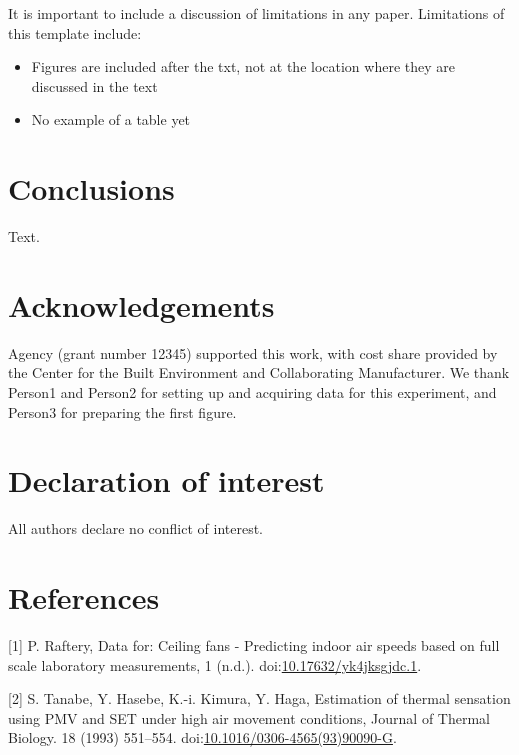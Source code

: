 \documentclass[]{elsarticle} %
\providecommand{\tightlist}{%
  \setlength{\itemsep}{0pt}\setlength{\parskip}{0pt}}
\begin{document}
It is important to include a discussion of limitations in any paper.
Limitations of this template include:

\begin{itemize}
\tightlist
\item
  Figures are included after the txt, not at the location where they are
  discussed in the text
\item
  No example of a table yet
\end{itemize}

\section{Conclusions}\label{conclusions}

Text.

\section{Acknowledgements}\label{acknowledgements}

Agency (grant number 12345) supported this work, with cost share
provided by the Center for the Built Environment and Collaborating
Manufacturer. We thank Person1 and Person2 for setting up and acquiring
data for this experiment, and Person3 for preparing the first figure.

\section{Declaration of interest}\label{declaration-of-interest}

All authors declare no conflict of interest.

\section*{References}\label{references}

\hypertarget{refs}{}
\hypertarget{ref-rafteryDataCeilingFans}{}
{[}1{]} P. Raftery, Data for: Ceiling fans - Predicting indoor air
speeds based on full scale laboratory measurements, 1 (n.d.).
doi:\href{https://doi.org/10.17632/yk4jksgjdc.1}{10.17632/yk4jksgjdc.1}.

\hypertarget{ref-tanabeEstimationThermalSensation1993}{}
{[}2{]} S. Tanabe, Y. Hasebe, K.-i. Kimura, Y. Haga, Estimation of
thermal sensation using PMV and SET under high air movement conditions,
Journal of Thermal Biology. 18 (1993) 551--554.
doi:\href{https://doi.org/10.1016/0306-4565(93)90090-G}{10.1016/0306-4565(93)90090-G}.
\end{document}
